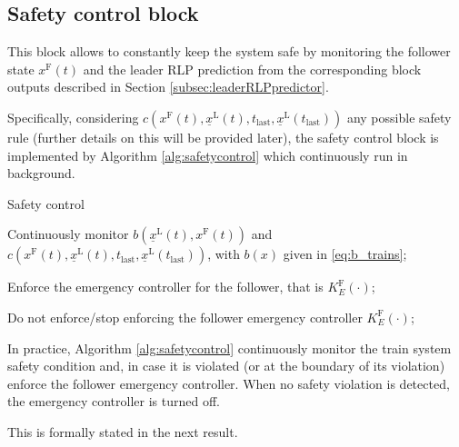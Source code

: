 \documentclass[letterpaper, 10 pt, conference]{ieeeconf}
\theoremstyle{definition}
\theoremstyle{nopoint}
\begin{document}
 
\subsection{Safety control block}
 \label{subsec:safetycontrolblock} 

This block allows to constantly keep the system safe by monitoring the follower state $x^\mathrm{F}(t)$ and the leader RLP prediction from the corresponding block outputs described in Section \ref{subsec:leaderRLPpredictor}. 

Specifically, considering $c(x^\mathrm{F}(t),\underline{x}^\mathrm{L}(t),t_{\mathrm{last}},\underline{x}^\mathrm{L}(t_{\mathrm{last}}))$ any possible safety rule (further details on this will be provided later), the safety control block is implemented by Algorithm \ref{alg:safetycontrol} which continuously run in background.

\begin{algorithm}
\caption{Safety control}\label{alg:safetycontrol}
\begin{algorithmic}[1]
\Loop

\State Continuously monitor $b({\underline{x}^\mathrm{L}} (t),{x^\mathrm{F}}(t))$ and $c(x^\mathrm{F}(t),\underline{x}^\mathrm{L}(t),t_{\mathrm{last}},\underline{x}^\mathrm{L}(t_{\mathrm{last}}))$, with $b(x)$ given in \eqref{eq:b_trains};

 
\State Enforce the emergency controller for the follower, that is $K_E^\mathrm{F}(\cdot)$;

\Else  

Do not enforce/stop enforcing the follower emergency controller $K_E^\mathrm{F}(\cdot)$;

\EndIf


\EndLoop

\end{algorithmic}
\end{algorithm}


In practice, Algorithm \ref{alg:safetycontrol} continuously monitor the train system safety condition and, in case it is violated (or at the boundary of its violation) enforce the follower emergency controller. When no safety violation is detected, the emergency controller is turned off. 

This is formally stated in the next result. 
\end{document}
